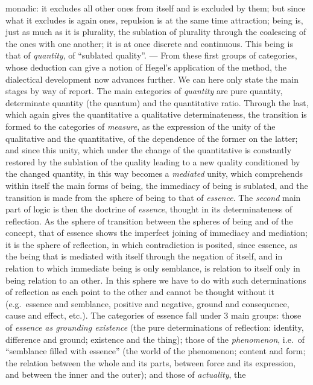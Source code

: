 monadic: it excludes all other ones from itself and is excluded by them;
but since what it excludes is again ones, repulsion is at the same time
attraction; being is, just as much as it is plurality, the sublation of
plurality through the coalescing of the ones with one another; it is at
once discrete and continuous. This being is that of \emph{quantity}, of
``sublated quality''. --- From these first groups of categories, whose
deduction can give a notion of Hegel's application of the method, the
dialectical development now advances further. We can here only state
the main stages by way of report. The main categories of
\emph{quantity} are pure quantity, determinate quantity (the quantum)
and the quantitative ratio. Through the last, which again gives the
quantitative a qualitative determinateness, the transition is formed to
the categories of \emph{measure}, as the expression of the unity of the
qualitative and the quantitative, of the dependence of the former on the
latter; and since this unity, which under the change of the
quantitative is constantly restored by the sublation of the quality
leading to a new quality conditioned by the changed quantity, in this
way becomes a \emph{mediated} unity, which comprehends within itself the
main forms of being, the immediacy of being is sublated, and the
transition is made from the sphere of being to that of \emph{essence}.
The \emph{second} main part of logic is then the doctrine of
\emph{essence}, thought in its determinateness of reflection. As the
sphere of transition between the spheres of being and of the concept,
that of essence shows the imperfect joining of immediacy and mediation;
it is the sphere of reflection, in which contradiction is posited, since
essence, as the being that is mediated with itself through the negation
of itself, and in relation to which immediate being is only semblance,
is relation to itself only in being relation to an other. In this
sphere we have to do with such determinations of reflection as each
point to the other and cannot be thought without it (e.g.\ essence and
semblance, positive and negative, ground and consequence, cause and
effect, etc.).
The categories of essence fall under 3 main groups: those of
\emph{essence as grounding existence} (the pure determinations of
reflection: identity, difference and ground; existence and the thing);
those of the \emph{phenomenon}, i.e.\ of ``semblance filled with
essence'' (the world of the phenomenon; content and form; the relation
between the whole and its parts, between force and its expression, and
between the inner and the outer); and those of \emph{actuality}, the
